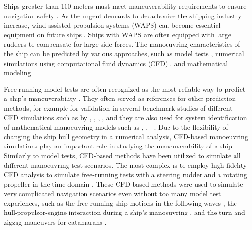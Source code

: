 Ships greater than 100 meters must meet maneuverability requirements to ensure navigation safety \citep{imoStandardsShipManoeuvrability2002}. As the urgent demands to decarbonize the shipping industry increase, wind-assisted propulsion systems (WAPS) can become essential equipment on future ships \citep{nelissenStudyAnalysisMarket2016}. Ships with WAPS are often equipped with large rudders to compensate for large side forces. The manoeuvring characteristics of the ship can be predicted by various approaches, such as model tests \citep{ittcManoeuvringCommitteeITTC2008}, numerical simulations using computational fluid dynamics (CFD) \citep{elmoctarRANSBasedSimulatedShip2014,dumanTurnZigzagManoeuvres2022}, and mathematical modeling \citep{abkowitzMEASUREMENTHYDRODYNAMICCHARACTERISTICS1980,fossenHandbookMarineCraft2011,yasukawaIntroductionMMGStandard2015,alexanderssonSystemIdentificationPhysicsinformed2024b}. 

Free-running model tests are often recognized as the most reliable way to predict a ship's maneuverability \citep{ittcITTCRecommendedProcedures2008}. They often served as references for other prediction methods, for example for validation in several benchmark studies of different CFD simulations such as by \citet{sternExperienceSIMMAN20082011}, \citet{sakamotoURANSSimulationsStatic2012}, \citet{yoonBenchmarkCFDValidation2015a}, \citet{yasukawaValidation6DOFMotion2021}, and they are also used for system identification of mathematical manoeuvring models such as \citet{luoParameterIdentificationShip2016}, \citet{xuUncertaintyAnalysisHydrodynamic2019}, \citet{wangOptimalDesignExcitation2020}, \citet{alexanderssonSystemIdentificationVessel2022}. Due to the flexibility of changing the ship hull geometry in a numerical analysis, CFD-based manoeuvring simulations play an important role in studying the maneuverability of a ship. Similarly to model tests, CFD-based methods have been utilized to simulate all different manoeuvring test scenarios. The most complex is to employ high-fidelity CFD analysis to simulate free-running tests with a steering rudder and a rotating propeller in the time domain \citep{dubbiosoTurningAbilityAnalysis2016a, islamEstimationHydrodynamicDerivatives2018}. These CFD-based methods were used to simulate very complicated navigation scenarios even without too many model test experiences, such as the free running ship motions in the following waves \citep{arakiImprovedManoeuvringBasedMathematical2019}, the hull-propulsor-engine interaction during a ship’s manoeuvring \citep{elmoctarRANSBasedSimulatedShip2014}, and the turn and zigzag maneuvers for catamarans \citep{dumanTurnZigzagManoeuvres2022}.

